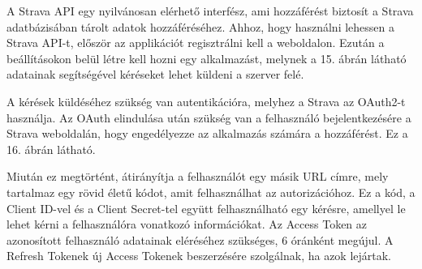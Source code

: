 A Strava API egy nyilvánosan elérhető interfész, ami hozzáférést biztosít a Strava adatbázisában tárolt adatok hozzáféréséhez. Ahhoz, hogy használni lehessen a Strava API-t, először az applikációt regisztrálni kell a weboldalon. Ezután a beállításokon belül létre kell hozni egy alkalmazást, melynek a 15. ábrán látható adatainak segítségével kéréseket lehet küldeni a szerver felé. 

A kérések küldéséhez szükség van autentikációra, melyhez a Strava az OAuth2-t használja. Az OAuth elindulása után szükség van a felhasználó bejelentkezésére a Strava weboldalán, hogy engedélyezze az alkalmazás számára a hozzáférést. Ez a 16. ábrán látható. 

Miután ez megtörtént, átirányítja a felhasználót egy másik URL címre, mely tartalmaz egy rövid életű kódot, amit felhasználhat az autorizációhoz. Ez a kód, a Client ID-vel és a Client Secret-tel együtt felhasználható egy kérésre, amellyel le lehet kérni a felhasználóra vonatkozó információkat. Az Access Token az azonosított felhasználó adatainak eléréséhez szükséges, 6 óránként megújul. A Refresh Tokenek új Access Tokenek beszerzésére szolgálnak, ha azok lejártak. 